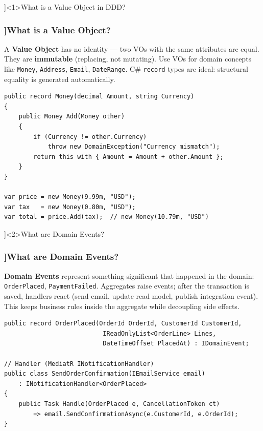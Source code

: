 \QuestionSlide[\CategoryBadge[DDDColor!20]{DDD \& CQRS}]<1>{What is a Value Object in DDD?}

\begin{frame}[fragile]
  \frametitle{\AnswerTitle[\CategoryBadge[DDDColor!20]{DDD \& CQRS}]{What is a Value Object?}}

  {\footnotesize
  A \textbf{Value Object} has no identity — two VOs with the same attributes are equal. They are \textbf{immutable} (replacing, not mutating). Use VOs for domain concepts like \texttt{Money}, \texttt{Address}, \texttt{Email}, \texttt{DateRange}. C\# \texttt{record} types are ideal: structural equality is generated automatically.
  }

  \begin{verbatim}
public record Money(decimal Amount, string Currency)
{
    public Money Add(Money other)
    {
        if (Currency != other.Currency)
            throw new DomainException("Currency mismatch");
        return this with { Amount = Amount + other.Amount };
    }
}

var price = new Money(9.99m, "USD");
var tax   = new Money(0.80m, "USD");
var total = price.Add(tax);  // new Money(10.79m, "USD")
  \end{verbatim}
\end{frame}

\QuestionSlide[\CategoryBadge[DDDColor!20]{DDD \& CQRS}]<2>{What are Domain Events?}

\begin{frame}[fragile]
  \frametitle{\AnswerTitle[\CategoryBadge[DDDColor!20]{DDD \& CQRS}]{What are Domain Events?}}

  {\footnotesize
  \textbf{Domain Events} represent something significant that happened in the domain: \texttt{OrderPlaced}, \texttt{PaymentFailed}. Aggregates raise events; after the transaction is saved, handlers react (send email, update read model, publish integration event). This keeps business rules inside the aggregate while decoupling side effects.
  }

  \begin{verbatim}
public record OrderPlaced(OrderId OrderId, CustomerId CustomerId,
                           IReadOnlyList<OrderLine> Lines,
                           DateTimeOffset PlacedAt) : IDomainEvent;

// Handler (MediatR INotificationHandler)
public class SendOrderConfirmation(IEmailService email)
    : INotificationHandler<OrderPlaced>
{
    public Task Handle(OrderPlaced e, CancellationToken ct)
        => email.SendConfirmationAsync(e.CustomerId, e.OrderId);
}
  \end{verbatim}
\end{frame}

